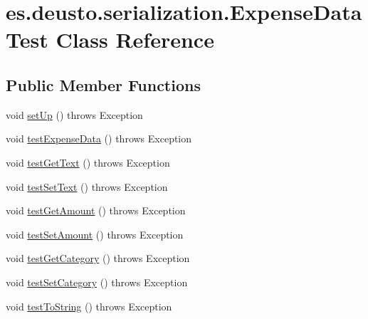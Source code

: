 \hypertarget{classes_1_1deusto_1_1serialization_1_1_expense_data_test}{}\section{es.\+deusto.\+serialization.\+Expense\+Data\+Test Class Reference}
\label{classes_1_1deusto_1_1serialization_1_1_expense_data_test}
\subsection*{Public Member Functions}
\begin{DoxyCompactItemize}
\item 
void \hyperlink{classes_1_1deusto_1_1serialization_1_1_expense_data_test_a8daee57c8227b100656635d3739be30a}{set\+Up} ()  throws Exception
\item 
void \hyperlink{classes_1_1deusto_1_1serialization_1_1_expense_data_test_af9c32f440da4f2b48125f23ff6816c43}{test\+Expense\+Data} ()  throws Exception 
\item 
void \hyperlink{classes_1_1deusto_1_1serialization_1_1_expense_data_test_ae6098eb509929cfdf9e3848e9b9178a1}{test\+Get\+Text} ()  throws Exception 
\item 
void \hyperlink{classes_1_1deusto_1_1serialization_1_1_expense_data_test_a9b9120ede1751dc400bbe740d6bfa87e}{test\+Set\+Text} ()  throws Exception 
\item 
void \hyperlink{classes_1_1deusto_1_1serialization_1_1_expense_data_test_a23166488d596924308d8a4f800b15537}{test\+Get\+Amount} ()  throws Exception 
\item 
void \hyperlink{classes_1_1deusto_1_1serialization_1_1_expense_data_test_aa7fd4daec0dae9ed19ae737e666e4203}{test\+Set\+Amount} ()  throws Exception 
\item 
void \hyperlink{classes_1_1deusto_1_1serialization_1_1_expense_data_test_a5f156cec176af911325693341f82b644}{test\+Get\+Category} ()  throws Exception 
\item 
void \hyperlink{classes_1_1deusto_1_1serialization_1_1_expense_data_test_a3b5cd1baa1d480f9f5f1e484161a5cee}{test\+Set\+Category} ()  throws Exception 
\item 
void \hyperlink{classes_1_1deusto_1_1serialization_1_1_expense_data_test_a36e81a35700d9baa7ff9ff65552e32c6}{test\+To\+String} ()  throws Exception 
\end{DoxyCompactItemize}


